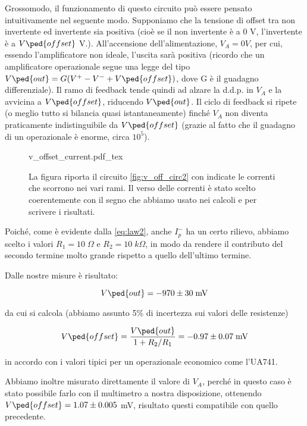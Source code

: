 Grossomodo, il funzionamento di questo circuito può essere pensato intuitivamente nel seguente modo.
Supponiamo che la tensione di offset tra non invertente ed invertente sia positiva (cioè se il non invertente è a 0 V, l'invertente è a $V\ped{offset}$ V.).
All'accensione dell'alimentazione,
$V_A = 0 V$, per cui, essendo l'amplificatore non ideale, l'uscita sarà positiva (ricordo che un amplificatore
operazionale segue una legge del tipo $V\ped{out} = G(V^+ - V^- + V\ped{offset})$, dove G è il guadagno differenziale).
Il ramo di feedback tende quindi ad alzare la d.d.p. in $V_A$ e la avvicina a $V\ped{offset}$, riducendo $V\ped{out}$.
Il ciclo di feedback si ripete (o meglio tutto si bilancia quasi istantaneamente) finché $V_A$ non diventa praticamente
indistinguibile da $V\ped{offset}$ (grazie al fatto che il guadagno di un operazionale è enorme, circa $10^5$).

\begin{figure}[t]
    \def\svgwidth{0.5\textwidth}
    {v_offset_current.pdf_tex}
    \caption{La figura riporta il circuito \ref{fig:v_off_circ2} con indicate le correnti che scorrono nei vari rami.
		Il verso delle correnti è stato scelto coerentemente con il segno che abbiamo usato nei calcoli e per scrivere i risultati.}
    \label{fig:circ_con_corr2}
\end{figure}

Poiché, come è evidente dalla \eqref{eq:law2}, anche $I_p^-$ ha un certo rilievo, abbiamo scelto i
valori $R_1 = 10 \; \Omega$ e $R_2 = 10 \; k\Omega$, in modo da rendere il contributo del secondo termine molto
grande rispetto a quello dell'ultimo termine.

Dalle nostre misure è risultato:

\begin{equation}
    V\ped{out} = - 970 \pm 30 \;\si{\milli\volt} 
\end{equation}

da cui si calcola (abbiamo assunto 5\% di incertezza sui valori delle resistenze)

\begin{equation}
    V\ped{offset} = \frac{V\ped{out}}{1 + R_2/R_1} = - 0.97 \pm 0.07 \; \si{\milli\volt}
\end{equation}

in accordo con i valori tipici per un operazionale economico come l'UA741.

Abbiamo inoltre misurato direttamente il valore di $V_A$, perché in questo caso è stato possibile
farlo con il multimetro a nostra disposizione, ottenendo $V\ped{offset} = 1.07 \pm 0.005$ mV, risultato
questi compatibile con quello precedente.

